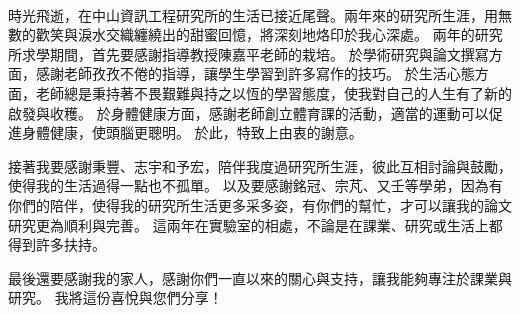\renewcommand{\thesisacknowledgmenthead}{Acknowledgments}
\begin{thesisacknowledgments}
\\
時光飛逝，在中山資訊工程研究所的生活已接近尾聲。兩年來的研究所生涯，用無數的歡笑與淚水交織纏繞出的甜蜜回憶，將深刻地烙印於我心深處。
兩年的研究所求學期間，首先要感謝指導教授陳嘉平老師的栽培。
於學術研究與論文撰寫方面，感謝老師孜孜不倦的指導，讓學生學習到許多寫作的技巧。
於生活心態方面，老師總是秉持著不畏艱難與持之以恆的學習態度，使我對自己的人生有了新的啟發與收穫。
於身體健康方面，感謝老師創立體育課的活動，適當的運動可以促進身體健康，使頭腦更聰明。
於此，特致上由衷的謝意。

  接著我要感謝秉豐、志宇和予宏，陪伴我度過研究所生涯，彼此互相討論與鼓勵，使得我的生活過得一點也不孤單。
  以及要感謝銘冠、宗芃、又壬等學弟，因為有你們的陪伴，使得我的研究所生活更多采多姿，有你們的幫忙，才可以讓我的論文研究更為順利與完善。
  這兩年在實驗室的相處，不論是在課業、研究或生活上都得到許多扶持。    
  
  最後還要感謝我的家人，感謝你們一直以來的關心與支持，讓我能夠專注於課業與研究。
  我將這份喜悅與您們分享！
      
\end{thesisacknowledgments}
